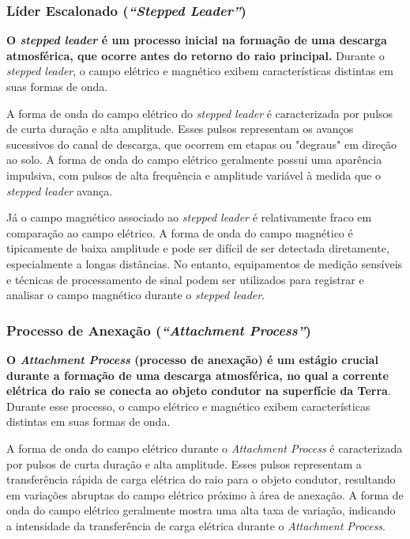 \documentclass[a4paper, 12pt, onecolumn,singlespacing]{article}
\begin{document}
	\subsubsection{Líder Escalonado (\textit{``Stepped Leader''})}
	
		\textbf{O \textit{stepped leader} é um processo inicial na formação de uma descarga atmosférica, que ocorre antes do retorno do raio principal.} Durante o \textit{stepped leader}, o campo elétrico e magnético exibem características distintas em suas formas de onda.
		
		A forma de onda do campo elétrico do \textit{stepped leader} é caracterizada por pulsos de curta duração e alta amplitude. Esses pulsos representam os avanços sucessivos do canal de descarga, que ocorrem em etapas ou "degraus" em direção ao solo. A forma de onda do campo elétrico geralmente possui uma aparência impulsiva, com pulsos de alta frequência e amplitude variável à medida que o \textit{stepped leader} avança.
		
		Já o campo magnético associado ao \textit{stepped leader} é relativamente fraco em comparação ao campo elétrico. A forma de onda do campo magnético é tipicamente de baixa amplitude e pode ser difícil de ser detectada diretamente, especialmente a longas distâncias. No entanto, equipamentos de medição sensíveis e técnicas de processamento de sinal podem ser utilizados para registrar e analisar o campo magnético durante o \textit{stepped leader}.
		
	\subsubsection{Processo de Anexação (\textit{``Attachment Process''})}
	
		\textbf{O \textit{Attachment Process} (processo de anexação) é um estágio crucial durante a formação de uma descarga atmosférica, no qual a corrente elétrica do raio se conecta ao objeto condutor na superfície da Terra}. Durante esse processo, o campo elétrico e magnético exibem características distintas em suas formas de onda.
		
		A forma de onda do campo elétrico durante o \textit{Attachment Process} é caracterizada por pulsos de curta duração e alta amplitude. Esses pulsos representam a transferência rápida de carga elétrica do raio para o objeto condutor, resultando em variações abruptas do campo elétrico próximo à área de anexação. A forma de onda do campo elétrico geralmente mostra uma alta taxa de variação, indicando a intensidade da transferência de carga elétrica durante o \textit{Attachment Process}.
		
\end{document}
